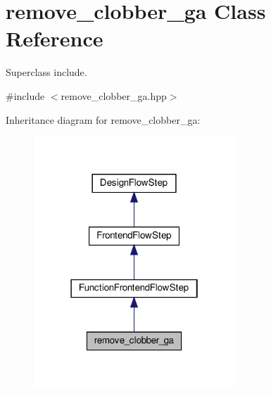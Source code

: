 \hypertarget{classremove__clobber__ga}{}\section{remove\+\_\+clobber\+\_\+ga Class Reference}
\label{classremove__clobber__ga}


Superclass include.  




{\ttfamily \#include $<$remove\+\_\+clobber\+\_\+ga.\+hpp$>$}



Inheritance diagram for remove\+\_\+clobber\+\_\+ga\+:
\nopagebreak
\begin{figure}[H]
\begin{center}
\leavevmode
\includegraphics[width=214pt]{d6/d1f/classremove__clobber__ga__inherit__graph}
\end{center}
\end{figure}


